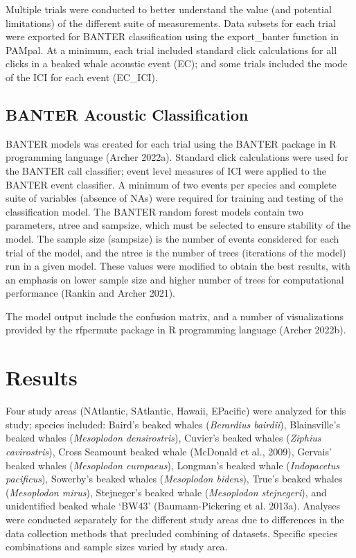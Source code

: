 \documentclass[
  letterpaper,
  DIV=11,
  numbers=noendperiod]{scrartcl}
\begin{document}
Multiple trials were conducted to better understand the value (and
potential limitations) of the different suite of measurements. Data
subsets for each trial were exported for BANTER classification using the
export\_banter function in PAMpal. At a minimum, each trial included
standard click calculations for all clicks in a beaked whale acoustic
event (EC); and some trials included the mode of the ICI for each event
(EC\_ICI).

\hypertarget{banter-acoustic-classification}{%
\subsection{BANTER Acoustic
Classification}\label{banter-acoustic-classification}}

BANTER models was created for each trial using the BANTER package in R
programming language (Archer 2022a). Standard click calculations were
used for the BANTER call classifier; event level measures of ICI were
applied to the BANTER event classifier. A minimum of two events per
species and complete suite of variables (absence of NAs) were required
for training and testing of the classification model. The BANTER random
forest models contain two parameters, ntree and sampsize, which must be
selected to ensure stability of the model. The sample size (sampsize) is
the number of events considered for each trial of the model, and the
ntree is the number of trees (iterations of the model) run in a given
model. These values were modified to obtain the best results, with an
emphasis on lower sample size and higher number of trees for
computational performance (Rankin and Archer 2021).

The model output include the confusion matrix, and a number of
visualizations provided by the rfpermute package in R programming
language (Archer 2022b).

\hypertarget{results}{%
\section{Results}\label{results}}

Four study areas (NAtlantic, SAtlantic, Hawaii, EPacific) were analyzed
for this study; species included: Baird's beaked whales (\emph{Berardius
bairdii}), Blainsville's beaked whales (\emph{Mesoplodon densirostris}),
Cuvier's beaked whales (\emph{Ziphius cavirostris}), Cross Seamount
beaked whale (McDonald et al., 2009), Gervais' beaked whales
(\emph{Mesoplodon europaeus}), Longman's beaked whale (\emph{Indopacetus
pacificus}), Sowerby's beaked whales (\emph{Mesoplodon bidens}), True's
beaked whales (\emph{Mesoplodon mirus}), Stejneger's beaked whale
(\emph{Mesoplodon stejnegeri}), and unidentified beaked whale `BW43'
(Baumann-Pickering et al. 2013a). Analyses were conducted separately for
the different study areas due to differences in the data collection
methods that precluded combining of datasets. Specific species
combinations and sample sizes varied by study area.
\end{document}
